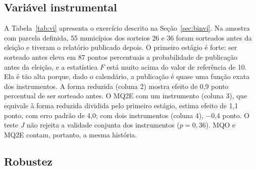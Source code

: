 \FloatBarrier
\subsection{Variável instrumental}

A Tabela~\ref{tab:vi} apresenta o exercício descrito na Seção~\ref{sec:binvi}. Na amostra com parcela
definida, 55 municípios dos sorteios 26 e 36 foram sorteados antes da eleição e tiveram o relatório
publicado depois. O primeiro estágio é forte: ser sorteado antes eleva em 87 pontos percentuais a
probabilidade de publicação antes da eleição, e a estatística $F$ está muito acima do valor de referência
de 10. Ela é tão alta porque, dado o calendário, a publicação é quase uma função exata dos instrumentos. A
forma reduzida (coluna 2) mostra efeito de 0,9 ponto percentual de ser sorteado antes. O MQ2E com um
instrumento (coluna 3), que equivale à forma reduzida dividida pelo primeiro estágio, estima efeito de 1,1
ponto, com erro padrão de 4,0; com dois instrumentos (coluna 4), $-$0,4 ponto. O teste $J$ não rejeita a
validade conjunta dos instrumentos ($p=0{,}36$). MQO e MQ2E contam, portanto, a mesma história.

\begin{table}[!htb]
\centering
\caption{Variável instrumental: sorteio antes da eleição como instrumento para a divulgação}\label{tab:vi}
\footnotesize

\end{table}

\FloatBarrier
\subsection{Robustez}\label{sec:rob}

\begin{table}[!htb]
\centering
\caption{Testes de robustez}\label{tab:rob}
\footnotesize\setlength{\tabcolsep}{4.5pt}

\end{table}


